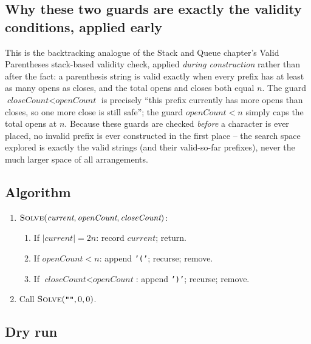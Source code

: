 \subsection*{Why these two guards are exactly the validity conditions, applied early}

This is the backtracking analogue of
the Stack and Queue chapter's Valid Parentheses stack-based validity check,
applied \emph{during construction} rather than after the fact: a
parenthesis string is valid exactly when every prefix has at least as
many opens as closes, and the total opens and closes both equal $n$. The
guard $\textit{closeCount} < \textit{openCount}$ is precisely
``this prefix currently has more opens than closes, so one more close is
still safe''; the guard $\textit{openCount} < n$ simply caps the total
opens at $n$. Because these guards are checked \emph{before} a character
is ever placed, no invalid prefix is ever constructed in the first
place -- the search space explored is exactly the valid strings (and
their valid-so-far prefixes), never the much larger space of all
arrangements.

\subsection*{Algorithm}

\begin{enumerate}
  \item $\textsc{Solve}(\textit{current}, \textit{openCount}, \textit{closeCount})$:
  \begin{enumerate}
    \item If $|\textit{current}| = 2n$: record $\textit{current}$;
          return.
    \item If $\textit{openCount} < n$: append \texttt{'('}; recurse;
          remove.
    \item If $\textit{closeCount} < \textit{openCount}$: append
          \texttt{')'}; recurse; remove.
  \end{enumerate}
  \item Call $\textsc{Solve}(\texttt{""}, 0, 0)$.
\end{enumerate}

\subsection*{Dry run}


